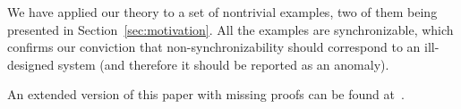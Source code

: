 We have applied our theory to a set of nontrivial examples, two of them being presented in Section~\ref{sec:motivation}. 
All the examples are synchronizable, which confirms our conviction that non-synchronizability should correspond to an ill-designed system (and therefore it should be reported as an anomaly).

An extended version of this paper with missing proofs can be found at~\cite{}.
\vspace{-2mm}


%
%
%
%
%
%
